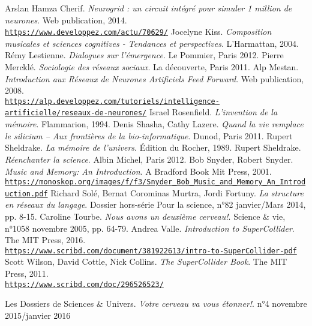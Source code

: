 \begin{thebibliography}{99}
        \bibitem[-, 2014]{}Arslan Hamza Cherif. \textit{Neurogrid : un circuit intégré pour simuler 1 million de neurones}. Web publication, 2014.\\ \href{https://www.developpez.com/actu/70629/Neurogrid-un-circuit-integre-pour-simuler-1-million-de-neurones-9-000-fois-mieux-qu-une-simulation-sur-ordinateur/}{\scriptsize{\texttt{https://www.developpez.com/actu/70629/}}} \normalsize{}
        \bibitem[-, 2004]{}Jocelyne Kiss. \textit{Composition musicales et sciences cognitives - Tendances et perspectives}. L'Harmattan, 2004.
        \bibitem[-, 2012]{}Rémy Lestienne. \textit{Dialogues sur l'émergence}. Le Pommier, Paris 2012.
        \bibitem[-, 2011]{}Pierre Mercklé. \textit{Sociologie des réseaux sociaux}. La découverte, Paris 2011.
        \bibitem[-, 2008]{}Alp Mestan. \textit{Introduction aux Réseaux de Neurones Artificiels Feed Forward}. Web publication, 2008.\\ \href{https://alp.developpez.com/tutoriels/intelligence-artificielle/reseaux-de-neurones/}{\scriptsize{\texttt{https://alp.developpez.com/tutoriels/intelligence-artificielle/reseaux-de-neurones/}}} \normalsize{}
        \bibitem[-, 1994]{}Israel Rosenfield. \textit{L'invention de la mémoire}. Flammarion, 1994.
        \bibitem[-, 2011]{}Denis Shasha, Cathy Lazere. \textit{Quand la vie remplace le silicium -- Aux frontières de la bio-informatique}. Dunod, Paris 2011.
        \bibitem[-, 1989]{}Rupert Sheldrake. \textit{La mémoire de l'univers}. Édition du Rocher, 1989.
        \bibitem[-, 2012]{}Rupert Sheldrake. \textit{Réenchanter la science}. Albin Michel, Paris 2012.
         Bob Snyder, Robert Snyder. \textit{Music and Memory: An Introduction}. A Bradford Book Mit Press, 2001.\\ \href{https://monoskop.org/images/f/f3/Snyder\_Bob\_Music\_and\_Memory\_An\_Introduction.pdf}{\scriptsize{\texttt{https://monoskop.org/images/f/f3/Snyder\_Bob\_Music\_and\_Memory\_An\_Introduction.pdf}}} \normalsize{}
        \bibitem[-, 2014]{}Richard Solé, Bernat Corominas Murtra, Jordi Fortuny. \textit{La structure en réseaux du langage}. Dossier hors-série Pour la science, n°82 janvier/Mars 2014, pp. 8-15.        
        \bibitem[-, 2005]{}Caroline Tourbe. \textit{Nous avons un deuxième cerveau!}. Science \& vie, n°1058 novembre 2005, pp. 64-79.
        \bibitem[-, 2016]{}Andrea Valle. \textit{Introduction to SuperCollider}. The MIT Press, 2016.\\ \href{https://www.scribd.com/document/381922613/intro-to-SuperCollider-pdf}{\scriptsize{\texttt{https://www.scribd.com/document/381922613/intro-to-SuperCollider-pdf}}} \normalsize{}
        \bibitem[-, 2011]{}Scott Wilson, David Cottle, Nick Collins. \textit{The SuperCollider Book}. The MIT Press, 2011.\\ \href{https://www.scribd.com/doc/296526523/The-Supercollider-Book-Scott-Wilson-David-Cottle-Nick-Collins}{\scriptsize{\texttt{https://www.scribd.com/doc/296526523/}}} \normalsize{}
                
        \bibitem[-, 2016]{}Les Dossiers de Sciences \& Univers. \textit{Votre cerveau va vous étonner!}. n°4 novembre 2015/janvier 2016
        
\end{thebibliography}